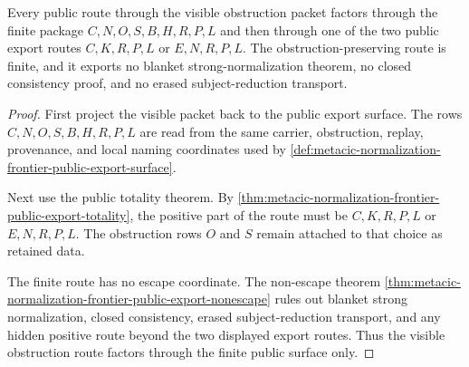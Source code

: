 \begin{theorem}
\label{thm:metacic-normalization-frontier-visible-obstruction-route-factorization}
Every public route through the visible obstruction packet factors through the
finite package $C,N,O,S,B,H,R,P,L$ and then through one of the two public
export routes $C,K,R,P,L$ or $E,N,R,P,L$. The obstruction-preserving route is
finite, and it exports no blanket strong-normalization theorem, no closed
consistency proof, and no erased subject-reduction transport.
\end{theorem}
\begin{proof}
First project the visible packet back to the public export surface. The rows
$C,N,O,S,B,H,R,P,L$ are read from the same carrier, obstruction, replay,
provenance, and local naming coordinates used by
\autoref{def:metacic-normalization-frontier-public-export-surface}.

Next use the public totality theorem. By
\autoref{thm:metacic-normalization-frontier-public-export-totality}, the
positive part of the route must be $C,K,R,P,L$ or $E,N,R,P,L$. The obstruction
rows $O$ and $S$ remain attached to that choice as retained data.

The finite route has no escape coordinate. The non-escape theorem
\autoref{thm:metacic-normalization-frontier-public-export-nonescape} rules out
blanket strong normalization, closed consistency, erased subject-reduction
transport, and any hidden positive route beyond the two displayed export
routes. Thus the visible obstruction route factors through the finite public
surface only.
\end{proof}

